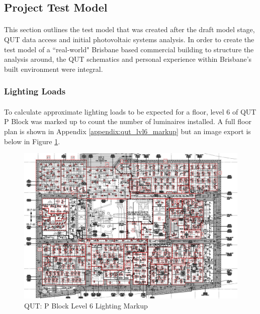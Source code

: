 
\subsection{Project Test Model}

\paragraph{}
This section outlines the test model that was created after the draft model stage, QUT data access and initial photovoltaic systems analysis. In order to create the test model of a ``real-world" Brisbane based commercial building to structure the analysis around, the QUT schematics and personal experience within Brisbane's built environment were integral. 

\subsubsection{Lighting Loads}

\paragraph{}
To calculate approximate lighting loads to be expected for a floor, level 6 of QUT P Block was marked up to count the number of luminaires installed. A full floor plan is shown in Appendix \ref{appendix:qut_lvl6_markup} but an image export is below in Figure \ref{fig:qut-lvl6-lighting-markup}.      

\begin{figure}[H]
	\hfill\includegraphics[width = 150mm]{images/project-model/qut-lvl6-lighting-markup}\hspace*{\fill}
	\caption{QUT: P Block Level 6 Lighting Markup} 
	\label{fig:qut-lvl6-lighting-markup}
\end{figure}

